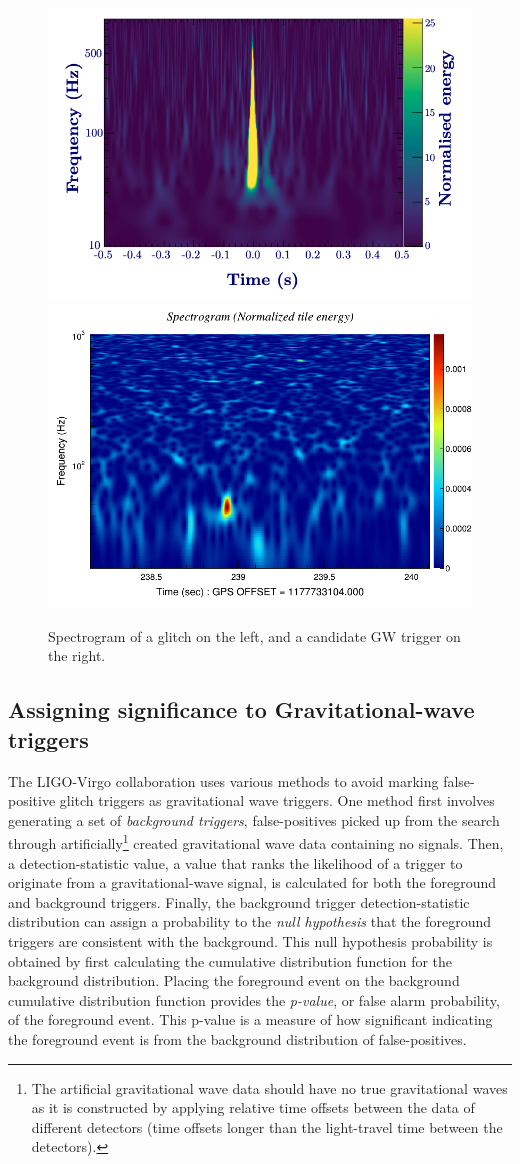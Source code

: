 \documentclass[%
 reprint,
 amsmath,amssymb,
 aps,
]{revtex4}
\begin{document}
\begin{figure}

{\centering \includegraphics[width=0.45\linewidth]{images/glitch} \includegraphics[width=0.45\linewidth]{images/L1_spectrogram_logy_0} 

}

\caption[Comparing glitches to high-mass candidates.]{Spectrogram of a glitch on the left, and a candidate GW trigger on the right.}\label{fig:compareGlitchAndSignal}
\end{figure}

\hypertarget{assigning-significance-to-gravitational-wave-triggers}{%
\subsection{Assigning significance to Gravitational-wave triggers}\label{assigning-significance-to-gravitational-wave-triggers}}

The LIGO-Virgo collaboration uses various methods to avoid marking false-positive glitch triggers as gravitational wave
triggers. One method first involves generating a set of \emph{background triggers}, false-positives picked up from the search
through artificially\footnote{The artificial gravitational wave data
  should have no true gravitational waves as it is constructed by applying relative time offsets between the data of different detectors (time offsets longer than the light-travel time between the detectors).} created gravitational
wave data containing no signals. Then, a detection-statistic value, a value
that ranks the likelihood of a trigger to originate from a gravitational-wave signal, is calculated for both the
foreground and background triggers. Finally, the background trigger detection-statistic distribution can assign a probability to the \emph{null hypothesis} that the foreground triggers are consistent with the background. This null hypothesis probability is obtained by first calculating the cumulative distribution function for the background distribution. Placing the foreground event on the background cumulative distribution function provides the \emph{p-value}, or false alarm probability, of the foreground event. This p-value is a measure of how significant indicating the foreground event is from the background distribution of false-positives.
\end{document}
